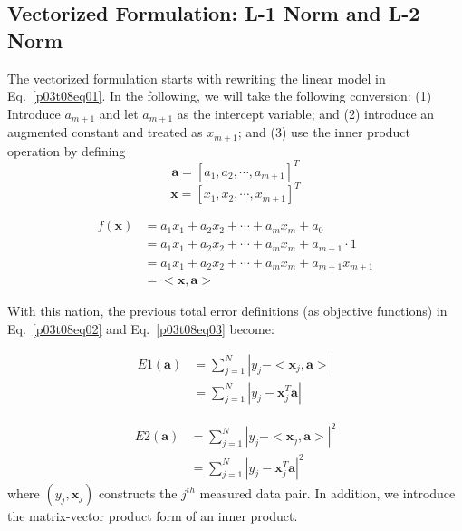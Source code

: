 \documentclass[12pt]{article}
\begin{document}
\subsection{Vectorized Formulation: L-1 Norm and L-2 Norm}
The vectorized formulation starts with rewriting the linear model in Eq.~\ref{p03t08eq01}. In the following, we will take the following conversion: (1) Introduce $a_{m+1}$ and let $a_{m+1}$ as the intercept variable; and (2) introduce an augmented constant and treated as $x_{m+1}$; and (3) use the inner product operation by defining 
\[
\mathbf{a} = [a_1, a_2, \cdots, a_{m+1}]^T
\]
\[
\mathbf{x} = [x_1, x_2, \cdots, x_{m+1}]^T
\]

\begin{equation}
\begin{split}
f(\mathbf{x}) & = a_1 x_1 + a_2 x_2 + \cdots + a_m x_m + a_0 \\
              & = a_1 x_1 + a_2 x_2 + \cdots + a_m x_m + a_{m+1} \cdot 1 \\
              & = a_1 x_1 + a_2 x_2 + \cdots + a_m x_m + a_{m+1} x_{m+1} \\
              & = <\mathbf{x}, \mathbf{a}>
\end{split}
\label{p03t08eq05}
\end{equation}

With this nation, the previous total error definitions (as objective functions) in Eq.~\ref{p03t08eq02} and Eq.~\ref{p03t08eq03} become:

\begin{equation}
\begin{split}
E1(\mathbf{a}) & = \sum_{j = 1}^N |y_j - <\mathbf{x}_j, \mathbf{a}>| \\
               & = \sum_{j = 1}^N |y_j - \mathbf{x}_j^T \mathbf{a}|
\end{split}
\label{p03t08eq06}
\end{equation}

\begin{equation}
\begin{split}
E2(\mathbf{a}) & = \sum_{j = 1}^N |y_j - <\mathbf{x}_j, \mathbf{a}>|^2 \\
            &  = \sum_{j = 1}^N |y_j - \mathbf{x}_j^T \mathbf{a}|^2
\end{split}
\label{p03t08eq07}
\end{equation}
where $(y_j, \mathbf{x}_j)$ constructs the $j^{th}$ measured data pair. In addition, we introduce the matrix-vector product form of an inner product.
\end{document}

